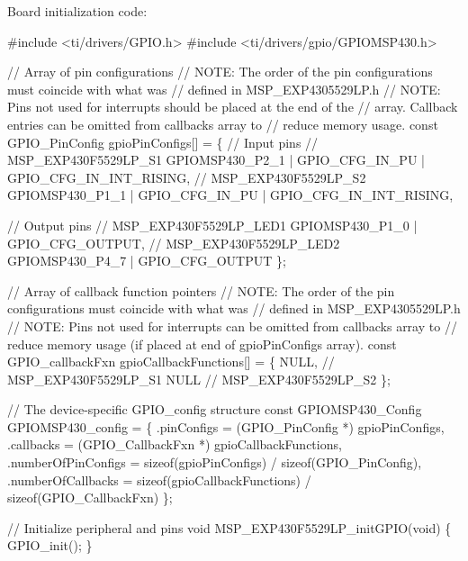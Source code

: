 Board initialization code\+: 
\begin{DoxyCode}
\textcolor{preprocessor}{#include <ti/drivers/GPIO.h>}
\textcolor{preprocessor}{#include <ti/drivers/gpio/GPIOMSP430.h>}

\textcolor{comment}{// Array of pin configurations}
\textcolor{comment}{// NOTE: The order of the pin configurations must coincide with what was}
\textcolor{comment}{//       defined in MSP\_EXP4305529LP.h}
\textcolor{comment}{// NOTE: Pins not used for interrupts should be placed at the end of the}
\textcolor{comment}{//       array.  Callback entries can be omitted from callbacks array to}
\textcolor{comment}{//       reduce memory usage.}
\textcolor{keyword}{const} GPIO_PinConfig gpioPinConfigs[] = \{
    \textcolor{comment}{// Input pins}
    \textcolor{comment}{// MSP\_EXP430F5529LP\_S1}
    GPIOMSP430_P2_1 | GPIO_CFG_IN_PU | GPIO_CFG_IN_INT_RISING,
    \textcolor{comment}{// MSP\_EXP430F5529LP\_S2}
    GPIOMSP430_P1_1 | GPIO_CFG_IN_PU | GPIO_CFG_IN_INT_RISING,

    \textcolor{comment}{// Output pins}
    \textcolor{comment}{// MSP\_EXP430F5529LP\_LED1}
    GPIOMSP430_P1_0 | GPIO_CFG_OUTPUT,
    \textcolor{comment}{// MSP\_EXP430F5529LP\_LED2}
    GPIOMSP430_P4_7 | GPIO_CFG_OUTPUT
\};

\textcolor{comment}{// Array of callback function pointers}
\textcolor{comment}{// NOTE: The order of the pin configurations must coincide with what was}
\textcolor{comment}{//       defined in MSP\_EXP4305529LP.h}
\textcolor{comment}{// NOTE: Pins not used for interrupts can be omitted from callbacks array to}
\textcolor{comment}{//       reduce memory usage (if placed at end of gpioPinConfigs array).}
\textcolor{keyword}{const} GPIO\_callbackFxn gpioCallbackFunctions[] = \{
    NULL,       \textcolor{comment}{// MSP\_EXP430F5529LP\_S1}
    NULL        \textcolor{comment}{// MSP\_EXP430F5529LP\_S2}
\};

\textcolor{comment}{// The device-specific GPIO\_config structure}
\textcolor{keyword}{const} GPIOMSP430_Config GPIOMSP430\_config = \{
    .pinConfigs = (GPIO_PinConfig *) gpioPinConfigs,
    .callbacks = (GPIO_CallbackFxn *) gpioCallbackFunctions,
    .numberOfPinConfigs = \textcolor{keyword}{sizeof}(gpioPinConfigs) / \textcolor{keyword}{sizeof}(GPIO_PinConfig),
    .numberOfCallbacks = \textcolor{keyword}{sizeof}(gpioCallbackFunctions) / \textcolor{keyword}{sizeof}(GPIO_CallbackFxn)
\};

\textcolor{comment}{// Initialize peripheral and pins}
\textcolor{keywordtype}{void} MSP\_EXP430F5529LP\_initGPIO(\textcolor{keywordtype}{void})
\{
    GPIO_init();
\}
\end{DoxyCode}


